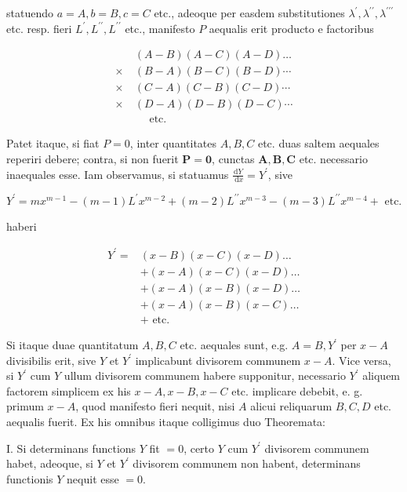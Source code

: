 \documentclass[10pt]{article}
\begin{document}
statuendo \(a=A, b=B, c=C\) etc., adeoque per easdem substitutiones \(\lambda^{\prime}, \lambda^{\prime \prime}, \lambda^{\prime \prime \prime}\) etc. resp. fieri \(L^{\prime}, L^{\prime \prime}, L^{\prime \prime}\) etc., manifesto \(P\) aequalis erit producto e factoribus

\[
\begin{aligned}
& (A-B)(A-C)(A-D) \ldots \\
\times & (B-A)(B-C)(B-D) \cdots \\
\times & (C-A)(C-B)(C-D) \cdots \\
\times & (D-A)(D-B)(D-C) \cdots \\
\quad & \quad \text { etc. }
\end{aligned}
\]

Patet itaque, si fiat \(P=0\), inter quantitates \(A, B, C\) etc. duas saltem aequales reperiri debere; contra, si non fuerit \(\boldsymbol{P}=\mathbf{0}\), cunctas \(\boldsymbol{A}, \boldsymbol{B}, \boldsymbol{C}\) etc. necessario inaequales esse. Iam observamus, si statuamus \(\frac{\mathrm{d} Y}{\mathrm{~d} x}=Y^{\prime}\), sive

\[
Y^{\prime}=m x^{m-1}-(m-1) L^{\prime} x^{m-2}+(m-2) L^{\prime \prime} x^{m-3}-(m-3) L^{\prime \prime} x^{m-4}+\text { etc. }
\]

haberi

\[
\begin{aligned}
Y^{\prime}= & (x-B)(x-C)(x-D) \ldots \\
& +(x-A)(x-C)(x-D) \ldots \\
& +(x-A)(x-B)(x-D) \ldots \\
& +(x-A)(x-B)(x-C) \ldots \\
& + \text { etc. }
\end{aligned}
\]

Si itaque duae quantitatum \(A, B, C\) etc. aequales sunt, e.g. \(A=B, Y^{\prime}\) per \(x-A\) divisibilis erit, sive \(Y\) et \(Y^{\prime}\) implicabunt divisorem communem \(x-A\). Vice versa, si \(Y^{\prime}\) cum \(Y\) ullum divisorem communem habere supponitur, necessario \(Y^{\prime}\) aliquem factorem simplicem ex his \(x-A, x-B, x-C\) etc. implicare debebit, e. g. primum \(x-A\), quod manifesto fieri nequit, nisi \(A\) alicui reliquarum \(B, C, D\) etc. aequalis fuerit. Ex his omnibus itaque colligimus duo Theoremata:

I. Si determinans functions \(Y\) fit \(=0\), certo \(Y\) cum \(Y^{\prime}\) divisorem communem habet, adeoque, si \(Y\) et \(Y^{\prime}\) divisorem communem non habent, determinans functionis \(Y\) nequit esse \(=0\).
\end{document}
